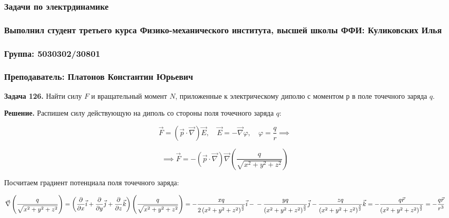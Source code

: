 \documentclass[a4paper,12pt]{article}
\begin{document}
	\begin{center}
		\subsubsection*{Задачи по электрдинамике}
		\subsubsection*{Выполнил студент третьего курса Физико-механического института, высшей школы ФФИ: Куликовских Илья}
		\subsubsection*{Группа: 5030302/30801}
		\subsubsection*{Преподаватель: Платонов Константин Юрьевич}
	\end{center}
	
	\quad \textbf{Задача 126.} Найти силу $F$ и вращательный момент $N$, приложенные к электрическому диполю с моментом $р$ в поле точечного заряда $q$.
	
	\quad \textbf{Решение.} Распишем силу действующую на диполь со стороны поля точечного заряда $q$: 
	
	\begin{equation}
		\vec{F} = \left(\vec{p} \cdot \vec{\nabla}\right)\vec{E}, \quad \vec{E} = -\vec{\nabla}\varphi, \quad \varphi = \dfrac{q}{r} \implies 
	\end{equation}
	
	\begin{equation}
		\implies\vec{F} = -\left(\vec{p}\cdot\vec{\nabla}\right)\vec{\nabla}\left(\dfrac{q}{\sqrt{x^2 + y^2 + z^2 }}\right)
	\end{equation}
	
	\quad Посчитаем градиент потенциала поля точечного заряда:
	
	$ \vec{\nabla} \left(\dfrac{q}{\sqrt{x^2 + y^2 + z^2}}\right) = \left(\dfrac{\partial }{\partial x} \vec{i} + \dfrac{\partial}{\partial y}\vec{j} + \dfrac{\partial}{\partial z} \vec{k}\right) \left(\dfrac{q}{\sqrt{x^2 + y^2 + z^2}}\right) = -\dfrac{xq}{2\left(x^2 + y^2 + z^2\right)^{\frac{3}{2}}}\vec{i} -\newline- \dfrac{yq}{\left(x^2 + y^2 + z^2\right)^{\frac{3}{2}}}\vec{j} - \dfrac{zq}{\left(x^2 + y^2 + z^2\right)^{\frac{3}{2}}}\vec{k} = -\dfrac{q\vec{r}}{\left(x^2 + y^2 + z^2\right)^{\frac{3}{2}}} = -\dfrac{q\vec{r}}{r^3}$ 
	
\end{document}
